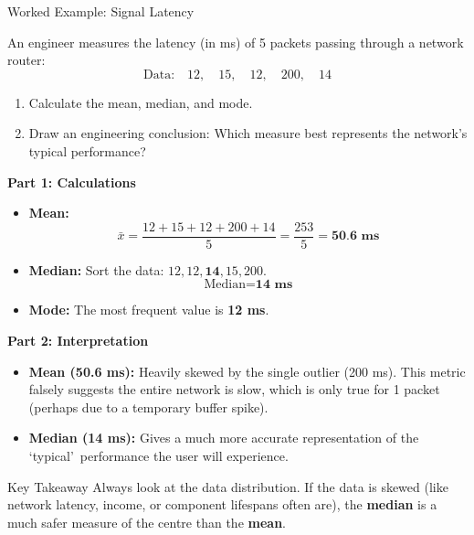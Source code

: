 \begin{frame}[allowframebreaks]{Worked Example: Signal Latency}
    \begin{example}
        An engineer measures the latency (in ms) of 5 packets passing through a network router:
        \[ \text{Data:} \quad 12, \quad 15, \quad 12, \quad 200, \quad 14 \]
        
        \begin{enumerate}
            \item Calculate the mean, median, and mode.
            \item Draw an engineering conclusion: Which measure best represents the network's typical performance?
        \end{enumerate}
    \end{example}
    
    \pause
    
    \begin{solution}
        \textbf{Part 1: Calculations}
        \begin{itemize}
            \item \textbf{Mean:} 
            \[ \bar{x} = \frac{12+15+12+200+14}{5} = \frac{253}{5} = \textbf{50.6 ms} \]
            \item \textbf{Median:} Sort the data: $12, 12, \mathbf{14}, 15, 200$. 
            \[ \text{Median} = \textbf{14 ms} \]
            \item \textbf{Mode:} The most frequent value is \textbf{12 ms}.
        \end{itemize}
        \end{solution}
        \vspace{0.3cm}
        \begin{solution}
        \textbf{Part 2: Interpretation}
        \begin{itemize}
            \item \textbf{Mean (50.6 ms):} Heavily skewed by the single outlier (200 ms). This metric falsely suggests the entire network is slow, which is only true for 1 packet (perhaps due to a temporary buffer spike).
            \item \textbf{Median (14 ms):} Gives a much more accurate representation of the \lq typical\rq\ performance the user will experience.
        \end{itemize}
    \end{solution}
    
    \begin{block}{Key Takeaway}
        Always look at the data distribution. If the data is skewed (like network latency, income, or component lifespans often are), the \textbf{median} is a much safer measure of the centre than the \textbf{mean}.
    \end{block}
\end{frame}
